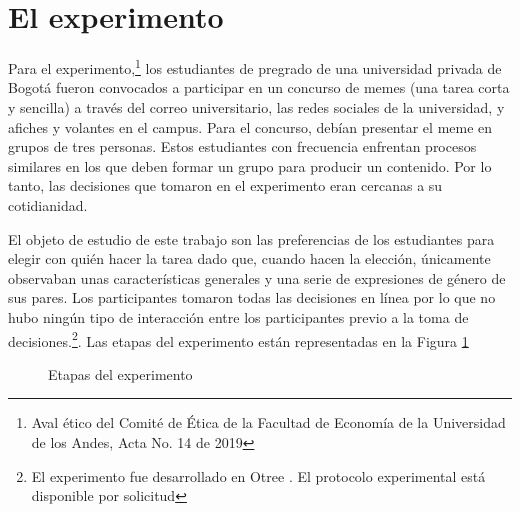 \section{El experimento}
Para el experimento,\footnote{Aval ético del Comité de Ética de la Facultad de Economía de la Universidad de los Andes, Acta No. 14 de 2019} los estudiantes de pregrado de una universidad privada de Bogotá fueron convocados a participar en un concurso de memes (una tarea corta y sencilla) a través del correo universitario, las redes sociales de la universidad, y afiches y volantes en el campus. Para el concurso, debían presentar el meme en grupos de tres personas. Estos estudiantes con frecuencia enfrentan procesos similares en los que deben formar un grupo para producir un contenido. Por lo tanto, las decisiones que tomaron en el experimento eran cercanas a su cotidianidad. 

El objeto de estudio de este trabajo son las preferencias de los estudiantes para elegir con quién hacer la tarea dado que, cuando hacen la elección, únicamente observaban unas características generales y una serie de expresiones de género de sus pares.  Los participantes tomaron todas las decisiones en línea por lo que no hubo ningún tipo de interacción entre los participantes previo a la toma de decisiones.\footnote{El experimento fue desarrollado en Otree \citep{otree}. El protocolo experimental está disponible por solicitud}. Las etapas del experimento están representadas en la Figura \ref{fig:etapas_experimento}

\begin{figure}[htbp]
    \centering
    \caption{Etapas del experimento}
    \label{fig:etapas_experimento}
	\begin{singlespace}
    \end{singlespace}
\end{figure}

